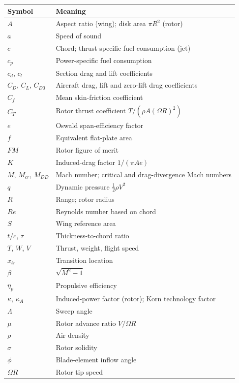\documentclass[10pt,a4paper,twocolumn]{article}
\begin{document}
{\footnotesize\setlength{\tabcolsep}{4pt}\noindent \begin{tabularx}{\columnwidth}{l>{\raggedright\arraybackslash}X}
\toprule
\textbf{Symbol} & \textbf{Meaning} \\
\midrule
\(A\) & Aspect ratio (wing); disk area \(\pi R^2\) (rotor) \\
\(a\) & Speed of sound \\
\(c\) & Chord; thrust-specific fuel consumption (jet) \\
\(c_p\) & Power-specific fuel consumption \\
\(c_d\), \(c_l\) & Section drag and lift coefficients \\
\(C_D\), \(C_L\), \(C_{D0}\) & Aircraft drag, lift and zero-lift drag coefficients \\
\(C_f\) & Mean skin-friction coefficient \\
\(C_T\) & Rotor thrust coefficient \(T/(\rho A(\Omega R)^2)\) \\
\(e\) & Oswald span-efficiency factor \\
\(f\) & Equivalent flat-plate area \\
\(FM\) & Rotor figure of merit \\
\(K\) & Induced-drag factor \(1/(\pi A e)\) \\
\(M\), \(M_{cr}\), \(M_{DD}\) & Mach number; critical and drag-divergence Mach numbers \\
\(q\) & Dynamic pressure \(\tfrac12\rho V^2\) \\
\(R\) & Range; rotor radius \\
\(Re\) & Reynolds number based on chord \\
\(S\) & Wing reference area \\
\(t/c\), \(\tau\) & Thickness-to-chord ratio \\
\(T\), \(W\), \(V\) & Thrust, weight, flight speed \\
\(x_{tr}\) & Transition location \\
\(\beta\) & \(\sqrt{M^2-1}\) \\
\(\eta_p\) & Propulsive efficiency \\
\(\kappa\), \(\kappa_A\) & Induced-power factor (rotor); Korn technology factor \\
\(\Lambda\) & Sweep angle \\
\(\mu\) & Rotor advance ratio \(V/\Omega R\) \\
\(\rho\) & Air density \\
\(\sigma\) & Rotor solidity \\
\(\phi\) & Blade-element inflow angle \\
\(\Omega R\) & Rotor tip speed \\
\bottomrule
\end{tabularx}\par}\medskip
\end{document}
